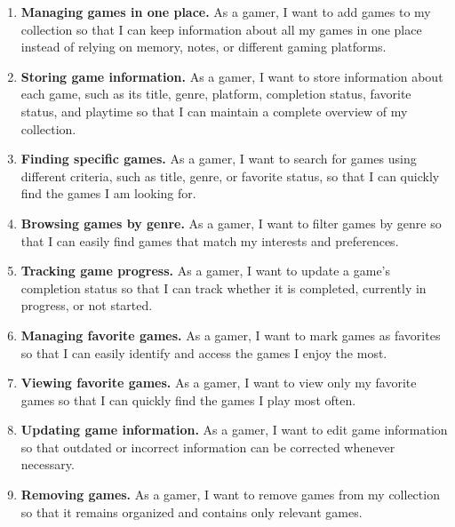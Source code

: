 \documentclass[11pt,a4paper]{report}
\begin{document}
\begin{enumerate}
      \item \textbf{Managing games in one place.}
            As a gamer, I want to add games to my collection so that I can keep
            information about all my games in one place instead of relying on
            memory, notes, or different gaming platforms.

      \item \textbf{Storing game information.}
            As a gamer, I want to store information about each game, such as its
            title, genre, platform, completion status, favorite status, and playtime
            so that I can maintain a complete overview of my collection.

      \item \textbf{Finding specific games.}
            As a gamer, I want to search for games using different criteria, such as
            title, genre, or favorite status, so that I can quickly find the games
            I am looking for.

      \item \textbf{Browsing games by genre.}
            As a gamer, I want to filter games by genre so that I can easily find
            games that match my interests and preferences.

      \item \textbf{Tracking game progress.}
            As a gamer, I want to update a game's completion status so that I can
            track whether it is completed, currently in progress, or not started.

      \item \textbf{Managing favorite games.}
            As a gamer, I want to mark games as favorites so that I can easily
            identify and access the games I enjoy the most.

      \item \textbf{Viewing favorite games.}
            As a gamer, I want to view only my favorite games so that I can quickly
            find the games I play most often.

      \item \textbf{Updating game information.}
            As a gamer, I want to edit game information so that outdated or
            incorrect information can be corrected whenever necessary.

      \item \textbf{Removing games.}
            As a gamer, I want to remove games from my collection so that it
            remains organized and contains only relevant games.


\end{enumerate}
\end{document}
